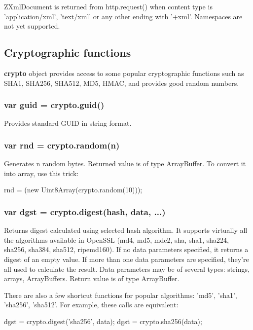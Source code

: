 ZXmlDocument is returned from http.request() when content type is 'application/xml', 
'text/xml' or any other ending with '+xml'. Namespaces are not yet supported.

\subsection{Cryptographic functions}

\textbf{crypto} object provides access to some popular cryptographic functions such
as SHA1, SHA256, SHA512, MD5, HMAC, and provides good random numbers.

\subsubsection{var guid = crypto.guid()}
Provides standard GUID in string format.

\subsubsection{var rnd = crypto.random(n)}
Generates n random bytes.
Returned value is of type ArrayBuffer. To convert it into array, use this trick:

\begin{listingverbatim}
	rnd = (new Uint8Array(crypto.random(10)));
\end{listingverbatim}

\subsubsection{var dgst = crypto.digest(hash, data, ...)}
Returns digest calculated using selected hash algorithm. It supports virtually all the 
algorithms available in OpenSSL (md4, md5, mdc2, sha, sha1, sha224, sha256, sha384, sha512, ripemd160).
If no data parameters specified, it returns a digest of an empty value. If more than one 
data parameters are specified, they're all used to calculate the result. Data parameters 
may be of several types: strings, arrays, ArrayBuffers.
Return value is of type ArrayBuffer.

There are also a few shortcut functions for popular algorithms: 'md5', 'sha1', 'sha256', 
'sha512'. For example, these calls are equivalent:

\begin{listingverbatim}
	dgst = crypto.digest('sha256', data);
	dgst = crypto.sha256(data);
\end{listingverbatim}

